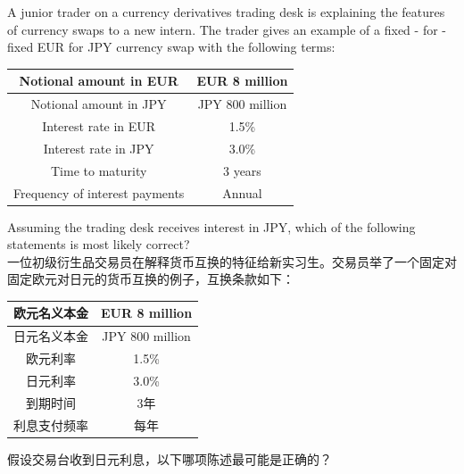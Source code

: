 \documentclass{article}
\newcounter{question} %
\begin{document}
\begin{question}
    A junior trader on a currency derivatives trading desk is explaining the features of currency swaps to a new intern. The trader gives an example of a fixed - for - fixed EUR for JPY currency swap with the following terms:
    \begin{center}
    \begin{tabular}{|c|c|}
    \hline
    Notional amount in EUR & EUR 8 million \\
    \hline
    Notional amount in JPY & JPY 800 million \\
    \hline
    Interest rate in EUR & 1.5\% \\
    \hline
    Interest rate in JPY & 3.0\% \\
    \hline
    Time to maturity & 3 years \\
    \hline
    Frequency of interest payments & Annual \\
    \hline
    \end{tabular}
    \end{center}
    Assuming the trading desk receives interest in JPY, which of the following statements is most likely correct?
    \\一位初级衍生品交易员在解释货币互换的特征给新实习生。交易员举了一个固定对固定欧元对日元的货币互换的例子，互换条款如下：
    \begin{center}
        \begin{tabular}{|c|c|}
        \hline
        欧元名义本金 & EUR 8 million \\
        \hline
        日元名义本金 & JPY 800 million \\
        \hline
        欧元利率 & 1.5\% \\
        \hline
        日元利率 & 3.0\% \\
        \hline
        到期时间 & 3年 \\
        \hline
        利息支付频率 & 每年 \\
        \hline
        \end{tabular}
        \end{center}
        假设交易台收到日元利息，以下哪项陈述最可能是正确的？
    \end{question}
    
\end{document}
